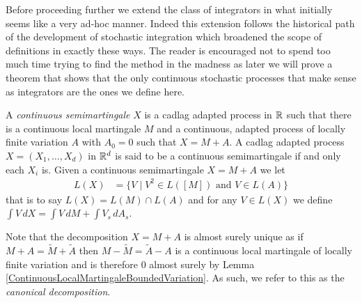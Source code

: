 Before proceeding further we extend the class of integrators in what initially seems like a very ad-hoc manner.  Indeed this extension follows the historical path of the development of stochastic integration which broadened the scope of definitions in exactly these ways.  The reader is encouraged not to spend too much time trying to find the method in the madness as later we will prove a theorem that shows that the only continuous stochastic processes that make sense as integrators are the ones we define here.
\begin{defn}A \emph{continuous  semimartingale} $X$ is a cadlag adapted process in $\mathbb{R}$ such that there is a continuous local martingale $M$ and a continuous, adapted process of locally finite variation $A$ with $A_0 = 0$ such that $X = M + A$.  A cadlag adapted process $X=(X_1, \dotsc, X_d)$ in $\mathbb{R}^d$ is said to be a continuous semimartingale if and only each $X_i$ is.  Given a continuous semimartingale $X = M + A$ we let 
\begin{align*}
L(X) &= \lbrace V \mid V^2 \in L([M]) \text{ and } V \in L(A) \rbrace
\end{align*}
that is to say $L(X) = L(M) \cap L(A)$ and for any $V \in L(X)$ we define $\int V \, dX = \int V \, dM + \int V_s \, dA_s$.
\end{defn} 
Note that the decomposition $X = M + A$ is almost surely unique as if $M + A = \tilde{M} + \tilde{A}$ then $M - \tilde{M} = \tilde{A} - A$ is a continuous local martingale of locally finite variation and is therefore $0$ almost surely by Lemma \ref{ContinuousLocalMartingaleBoundedVariation}.  As such, we refer to this as the \emph{canonical decomposition}.

